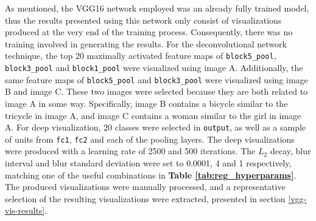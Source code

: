 As mentioned, the VGG16 network employed was an already fully trained model, thus the results presented using this network only consist of visualizations produced at the very end of the training process. Consequently, there was no training involved in generating the results. For the deconvolutional network technique, the top 20 maximally activated feature maps of \texttt{block5\_pool}, \texttt{block3\_pool} and \texttt{block1\_pool} were visualized using image A. Additionally, the same feature maps of \texttt{block5\_pool} and \texttt{block3\_pool} were visualized using image B and image C. These two images were selected because they are both related to image A in some way. Specifically, image B contains a bicycle similar to the tricycle in image A, and image C contains a woman similar to the girl in image A. For deep visualization, 20 classes were selected in \texttt{output}, as well as a sample of units from \texttt{fc1}, \texttt{fc2} and each of the pooling layers. The deep visualizations were produced with a learning rate of 2500 and 500 iterations. The $L_2$ decay, blur interval and blur standard deviation were set to 0.0001, 4 and 1 respectively, matching one of the useful combinations in \textbf{Table \ref{tab:reg_hyperparams}}. The produced visualizations were manually processed, and a representative selection of the resulting visualizations were extracted, presented in section \ref{vgg-vis-results}.

